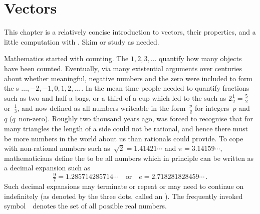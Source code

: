 
\chapter{Vectors}
\label{ch:v}

\minitoc

\begin{comment}
Introduce vectors, lines and planes, including adapting material from parts of Chapter~1 \pooliv{pp.1--55}, Chapter~2 (pre-\S2.1) of the book by \cite{Hopcroft2014},  \holti{\S2.1}, \larsvii{\S4.1} (short), et al.
Also Chapter~13 by \cite{HughesHallett2013}.
\end{comment}



\begin{aside}
This chapter is a relatively concise introduction to vectors, their properties, and a little computation with \script.  Skim or study as needed.
\end{aside}

Mathematics started with counting.
The  \(1,2,3,\ldots\) quantify how many objects have been counted.
Eventually, via many existential arguments over centuries about whether meaningful, negative numbers and the zero were included to form the s \(\ldots,-2,-1,0,1,2,\ldots\)\,.
In the mean time people needed to quantify fractions such as two and half a bags, or a third of a cup which led to the  such as \(2\tfrac12=\tfrac52\) or~\(\tfrac13\), and now defined as all numbers writeable in the form~\(\tfrac pq\) for integers~\(p\) and~\(q\) (\(q\)~non-zero).
Roughly two thousand years ago,  was forced to recognise that for many triangles the length of a side could not be rational, and hence there must be more numbers in the world about us than rationals could provide.
To cope with non-rational numbers such as~\(\sqrt2=1.41421\cdots\) and \(\pi=3.14159\cdots\), mathematicians define the  to be all numbers which in principle can be written as a decimal expansion such as
\begin{equation*}
\tfrac97=1.285714285714\cdots
\quad\text{or}\quad
e=2.718281828459\cdots\,.
\end{equation*}
Such decimal expansions may terminate or repeat or may need to continue on indefinitely (as denoted by the three dots, called an ).
The frequently invoked symbol~\RR\ denotes the set of all possible real numbers.

